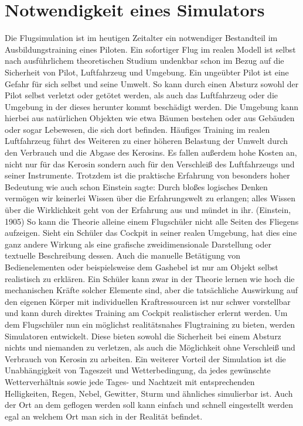 \documentclass[12pt]{article}
\begin{document}
\section{Notwendigkeit eines Simulators}
Die Flugsimulation ist im heutigen Zeitalter ein notwendiger Bestandteil im Ausbildungstraining eines Piloten. Ein sofortiger Flug im realen Modell ist selbst nach ausführlichem theoretischen Studium undenkbar schon im Bezug auf die Sicherheit von Pilot, Luftfahrzeug und Umgebung.\newline
Ein ungeübter Pilot ist eine Gefahr für sich selbst und seine Umwelt. So kann durch einen Absturz sowohl der Pilot selbst verletzt oder getötet werden, als auch das Luftfahrzeug oder die Umgebung in der dieses herunter kommt beschädigt werden. Die Umgebung kann hierbei aus natürlichen Objekten wie etwa Bäumen bestehen oder aus Gebäuden oder sogar Lebewesen, die sich dort befinden.\newline
Häufiges Training im realen Luftfahrzeug führt des Weiteren zu einer höheren Belastung der Umwelt durch den Verbrauch und die Abgase des Kerosins. Es fallen außerdem hohe Kosten an, nicht nur für das Kerosin sondern auch für den Verschleiß des Luftfahrzeugs und seiner Instrumente.\newline
Trotzdem ist die praktische Erfahrung von besonders hoher Bedeutung wie auch schon Einstein sagte: \glqq Durch bloßes logisches Denken vermögen wir keinerlei Wissen über die Erfahrungswelt zu erlangen; alles Wissen über die Wirklichkeit geht von der Erfahrung aus und mündet in ihr.\grqq{} (Einstein, 1905)\newline
So kann die Theorie alleine einem Flugschüler nicht alle Seiten des Fliegens aufzeigen.
Sieht ein Schüler das Cockpit in seiner realen Umgebung, hat dies eine ganz andere Wirkung als eine grafische zweidimensionale Darstellung oder textuelle Beschreibung dessen. Auch die manuelle Betätigung von Bedienelementen oder beispielsweise dem Gashebel ist nur am Objekt selbst realistisch zu erklären. Ein Schüler kann zwar in der Theorie lernen wie hoch die mechanischen Kräfte solcher Elemente sind, aber die tatsächliche Auswirkung auf den eigenen Körper mit individuellen Kraftressourcen ist nur schwer vorstellbar und kann durch direktes Training am Cockpit realistischer erlernt werden.\newline
Um dem Flugschüler nun ein möglichst realitätsnahes Flugtraining zu bieten, werden Simulatoren entwickelt. Diese bieten sowohl die Sicherheit bei einem Absturz nichts und niemanden zu verletzen, als auch die Möglichkeit ohne Verschleiß und Verbrauch von Kerosin zu arbeiten. Ein weiterer Vorteil der Simulation ist die Unabhängigkeit von Tageszeit und Wetterbedingung, da jedes gewünschte Wetterverhältnis sowie jede Tages- und Nachtzeit mit entsprechenden Helligkeiten, Regen, Nebel, Gewitter, Sturm und ähnliches simulierbar ist. Auch der Ort an dem geflogen werden soll kann einfach und schnell eingestellt werden egal an welchem Ort man sich in der Realität befindet.\newline
\end{document}
